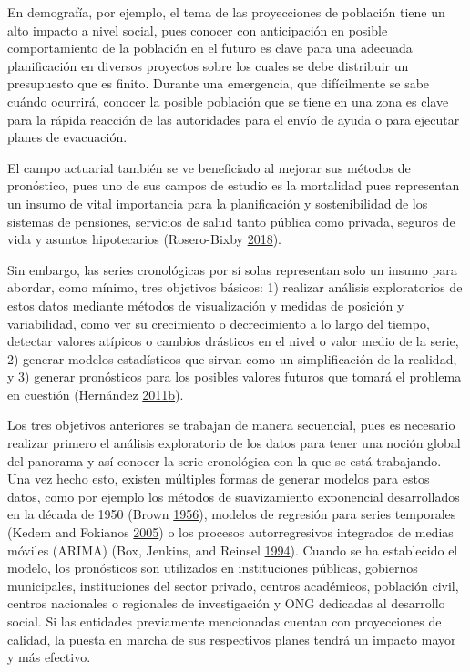 \documentclass[12pt]{article}
\begin{document}
En demografía, por ejemplo, el tema de las proyecciones de población
tiene un alto impacto a nivel social, pues conocer con anticipación en
posible comportamiento de la población en el futuro es clave para una
adecuada planificación en diversos proyectos sobre los cuales se debe
distribuir un presupuesto que es finito. Durante una emergencia, que
difícilmente se sabe cuándo ocurrirá, conocer la posible población que
se tiene en una zona es clave para la rápida reacción de las autoridades
para el envío de ayuda o para ejecutar planes de evacuación.

El campo actuarial también se ve beneficiado al mejorar sus métodos de
pronóstico, pues uno de sus campos de estudio es la mortalidad pues
representan un insumo de vital importancia para la planificación y
sostenibilidad de los sistemas de pensiones, servicios de salud tanto
pública como privada, seguros de vida y asuntos hipotecarios
(Rosero-Bixby \protect\hyperlink{ref-supenprodc}{2018}).

Sin embargo, las series cronológicas por sí solas representan solo un
insumo para abordar, como mínimo, tres objetivos básicos: 1) realizar
análisis exploratorios de estos datos mediante métodos de visualización
y medidas de posición y variabilidad, como ver su crecimiento o
decrecimiento a lo largo del tiempo, detectar valores atípicos o cambios
drásticos en el nivel o valor medio de la serie, 2) generar modelos
estadísticos que sirvan como un simplificación de la realidad, y 3)
generar pronósticos para los posibles valores futuros que tomará el
problema en cuestión (Hernández
\protect\hyperlink{ref-oscarh-2}{2011}\protect\hyperlink{ref-oscarh-2}{b}).

Los tres objetivos anteriores se trabajan de manera secuencial, pues es
necesario realizar primero el análisis exploratorio de los datos para
tener una noción global del panorama y así conocer la serie cronológica
con la que se está trabajando. Una vez hecho esto, existen múltiples
formas de generar modelos para estos datos, como por ejemplo los métodos
de suavizamiento exponencial desarrollados en la década de 1950 (Brown
\protect\hyperlink{ref-brown}{1956}), modelos de regresión para series
temporales (Kedem and Fokianos \protect\hyperlink{ref-kedem}{2005}) o
los procesos autorregresivos integrados de medias móviles (ARIMA) (Box,
Jenkins, and Reinsel \protect\hyperlink{ref-box-jenkins}{1994}). Cuando
se ha establecido el modelo, los pronósticos son utilizados en
instituciones públicas, gobiernos municipales, instituciones del sector
privado, centros académicos, población civil, centros nacionales o
regionales de investigación y ONG dedicadas al desarrollo social. Si las
entidades previamente mencionadas cuentan con proyecciones de calidad,
la puesta en marcha de sus respectivos planes tendrá un impacto mayor y
más efectivo.
\end{document}
